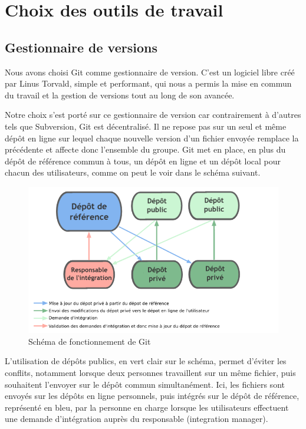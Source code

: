 \documentclass{report}
\begin{document}
\section{Choix des outils de travail}
\subsection{Gestionnaire de versions}
\hspace{0.5cm}Nous avons choisi Git comme gestionnaire de version. C'est un logiciel libre créé par Linus Torvald, simple et performant, qui nous a permis la mise en commun du travail et la gestion de versions tout au long de son avancée.\medskip
					
					Notre choix s'est porté sur ce gestionnaire de version car contrairement à d'autres tels que Subversion, Git est décentralisé. Il ne repose pas sur un seul et même dépôt en ligne sur lequel chaque nouvelle version d'un fichier envoyée remplace la précédente et affecte donc l'ensemble du groupe. Git met en place, en plus du dépôt de référence commun à tous, un dépôt en ligne et un dépôt local pour chacun des utilisateurs, comme on peut le voir dans le schéma suivant.\par
\begin{figure}[H]
	\begin{center}
			\includegraphics[scale=0.6]{./imagesRapport/schemaGit.png}
	\end{center}
	\caption[Schéma de fonctionnement de Git]{Schéma de fonctionnement de Git}
\end{figure}
\medskip
					 L'utilisation de dépôts publics, en vert clair sur le schéma, permet d'éviter les conflits, notamment lorsque deux personnes travaillent sur un même fichier, puis souhaitent l'envoyer sur le dépôt commun simultanément. Ici, les fichiers sont envoyés sur les dépôts en ligne personnels, puis intégrés sur le dépôt de référence, représenté en bleu, par la personne en charge lorsque les utilisateurs effectuent une demande d'intégration auprès du responsable (integration manager).\\
				
\end{document}

